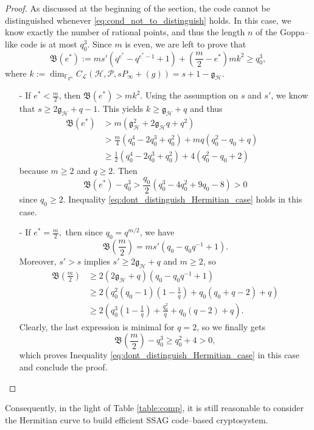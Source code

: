 \documentclass[lettersize,journal]{IEEEtran}
\theoremstyle{plain}
\theoremstyle{definition}
\theoremstyle{remark}
\newcommand{\calP}{\mathcal{P}}
\newcommand{\calH}{\mathcal{H}}
\newcommand{\fqm}{\mathbb{F}_{q^m}}
\begin{document}
	\begin{proof}
		As discussed at the beginning of the section, the code cannot be distinguished whenever \eqref{eq:cond_not_to_distinguish} holds. In this case, we know exactly the number of rational points, and thus the length $n$ of the Goppa--like code is at most $q_0^3$. Since $m$ is even, we are left to prove that 
		\begin{equation} \label{eq:dont_distinguish_Hermitian_case}
			\mathfrak{B}(e^*) := ms'(q^{e^*}-q^{e^*-1}+1) + \left( \frac{m}{2}-e^*\right)mk^2 \geq q_0^3,
		\end{equation}
		where $k  := \dim_{\fqm} C_{\mathcal{L}}(\calH, \calP, sP_\infty + (g)) = s+1-\mathfrak{g}_{\calH}$.
		\begin{itemize}
			\item [-] If $e^* < \frac{m}{2}$, then $\mathfrak{B}(e^*) > mk^2$. Using the assumption on $s$ and $s'$, we know that $s \geq 2\mathfrak{g}_{\calH}+q-1$. This yields $k \geq \mathfrak{g}_{\calH}+q$ and thus
			\begin{align*}
				\mathfrak{B}(e^*) 
				&> m(\mathfrak{g}_{\calH}^2+2\mathfrak{g}_{\calH}q+q^2)&\\
				& > \frac{m}{4}(q_0^4-2q_0^3+q_0^2) + mq(q_0^2-q_0+q)&\\
				& \geq \frac{1}{2}(q_0^4-2q_0^3+q_0^2)+4(q_0^2-q_0+2)
			\end{align*}
		because $m\geq 2$ and $q\geq 2$. Then 
		\[\mathfrak{B}(e^*) -q_0^3 > \frac{q_0}{2} (q_0^3-4q_0^2+9q_0-8) > 0 \]
			since $q_0 \geq 2$. Inequality \eqref{eq:dont_distinguish_Hermitian_case} holds in this case.
			\item[-] If $e^* = \frac{m}{2},$ then since $q_0=q^{m/2}$, we have 
			\[\mathfrak{B}\left(\frac{m}{2}\right) = ms'(q_0-q_0q^{-1}+1).\]
			 Moreover, $s'>s$ implies $s' \geq 2\mathfrak{g}_{\calH}+q$ and $m \geq 2$, so
			\begin{align*}
				\mathfrak{B}\left(\frac{m}{2}\right)
				&\geq 2(2\mathfrak{g}_{\calH}+q)(q_0-q_0q^{-1}+1)\\ 
				&\geq 2\left(q_0^2(q_0-1)\left(1-\frac{1}{q}\right)+q_0(q_0+q-2)+q\right) \\
				& \geq 2\left( q_0^3\left(1 - \frac{1}{q}\right)+ \frac{q_0^2}{q}+ q_0(q-2)+q\right).
			\end{align*}
			Clearly, the last expression is minimal for $q=2$, so we finally gets
			$$\mathfrak{B}\left(\frac{m}{2}\right)-q_0^3 \geq q_0^2 + 4 >0,$$
			which proves Inequality \eqref{eq:dont_distinguish_Hermitian_case} in this case and conclude the proof.
		\end{itemize}
	\end{proof}
	Consequently, in the light of Table \ref{table:comp}, it is still reasonable to consider the Hermitian curve to build efficient SSAG code--based cryptosystem.
	

	
	

	
	\newpage
	


\end{document}
